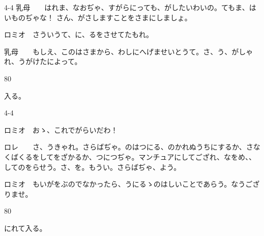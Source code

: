 \documentclass[tate,paper=b6j,jafontsize=9pt]{jlreq}
\begin{document}
\begin{azconvIndented}{4\zw}{-4\zw}
乳母　　はれま、なおぢゃ、すがらにっても、がしたいわいの。てもま、はいものぢゃな！ さん、がさしますことをさまにしましょ。

ロミオ　さういうて、に、るをさせてたもれ。

乳母　　もしえ、このはさまから、わしにへげませいとうて。さ、う、がしゃれ、うがけたによって。

\end{azconvIndented}
\begin{azconvIndented}{8\zw}{0\zw}

入る。

\end{azconvIndented}
\begin{azconvIndented}{4\zw}{-4\zw}

ロミオ　おゝ、これでがらいだわ！

ロレ　　さ、うきゃれ。さらばぢゃ。のはつにる、のかれぬうちにするか、さなくばくるをしてをざかるか、つにつぢゃ。マンチュアにしてござれ、なをめ、、してのをらせう。さ、を。もうい。さらばぢゃ、よう。

ロミオ　もいがをぶのでなかったら、うにるゝのはしいことであらう。なうござりませ。

\end{azconvIndented}
\begin{azconvIndented}{8\zw}{0\zw}

にれて入る。

\end{azconvIndented}
\end{document}
